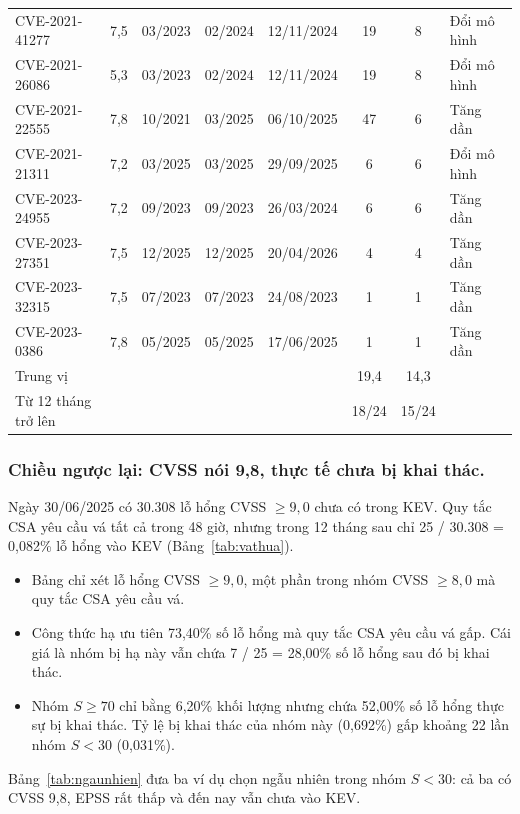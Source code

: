 \documentclass[runningheads]{llncs}
\begin{document}
\begin{table}
\begin{tabular}{lccccccl}
CVE-2021-41277 & 7,5 & 03/2023 & 02/2024 & 12/11/2024 & 19 & 8 & Đổi mô hình \\
CVE-2021-26086 & 5,3 & 03/2023 & 02/2024 & 12/11/2024 & 19 & 8 & Đổi mô hình \\
CVE-2021-22555 & 7,8 & 10/2021 & 03/2025 & 06/10/2025 & 47 & 6 & Tăng dần \\
CVE-2021-21311 & 7,2 & 03/2025 & 03/2025 & 29/09/2025 & 6 & 6 & Đổi mô hình \\
CVE-2023-24955 & 7,2 & 09/2023 & 09/2023 & 26/03/2024 & 6 & 6 & Tăng dần \\
CVE-2023-27351 & 7,5 & 12/2025 & 12/2025 & 20/04/2026 & 4 & 4 & Tăng dần \\
CVE-2023-32315 & 7,5 & 07/2023 & 07/2023 & 24/08/2023 & 1 & 1 & Tăng dần \\
CVE-2023-0386 & 7,8 & 05/2025 & 05/2025 & 17/06/2025 & 1 & 1 & Tăng dần \\
\midrule
Trung vị & & & & & 19,4 & 14,3 & \\
Từ 12 tháng trở lên & & & & & 18/24 & 15/24 & \\
\bottomrule
\end{tabular}
\end{table}

\subsubsection{Chiều ngược lại: CVSS nói 9,8, thực tế chưa bị khai thác.}
Ngày 30/06/2025 có 30.308 lỗ hổng CVSS $\ge 9{,}0$ chưa có trong KEV. Quy tắc CSA yêu cầu vá tất cả trong 48 giờ,
nhưng trong 12 tháng sau chỉ 25 / 30.308 = 0,082\% lỗ hổng vào KEV (Bảng~\ref{tab:vathua}).
\begin{itemize}
\item Bảng chỉ xét lỗ hổng CVSS $\ge 9{,}0$, một phần trong nhóm CVSS $\ge 8{,}0$ mà quy tắc CSA yêu cầu vá.
\item Công thức hạ ưu tiên 73,40\% số lỗ hổng mà quy tắc CSA yêu cầu vá gấp. Cái giá là nhóm bị hạ này vẫn chứa
7 / 25 = 28,00\% số lỗ hổng sau đó bị khai thác.
\item Nhóm $S \ge 70$ chỉ bằng 6,20\% khối lượng nhưng chứa 52,00\% số lỗ hổng thực sự bị khai thác. Tỷ lệ bị
khai thác của nhóm này (0,692\%) gấp khoảng 22 lần nhóm $S < 30$ (0,031\%).
\end{itemize}
Bảng~\ref{tab:ngaunhien} đưa ba ví dụ chọn ngẫu nhiên trong nhóm $S < 30$: cả ba có CVSS 9,8, EPSS rất thấp và
đến nay vẫn chưa vào KEV.
\end{document}
